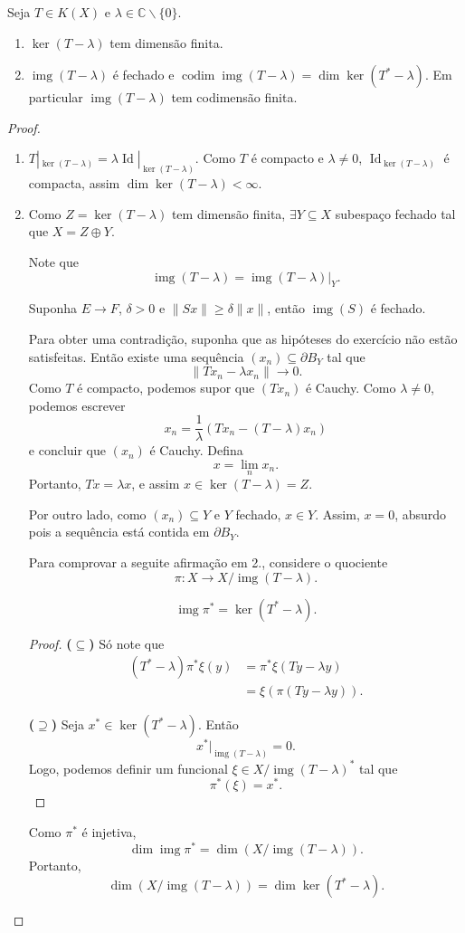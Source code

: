 \documentclass[portuguese]{article}
\theoremstyle{definition}
\newcommand{\C}{\mathbb{C}}
\DeclareMathOperator{\img}{img}
\DeclareMathOperator{\Id}{Id}
\begin{document}
\begin{teo}
	Seja $T\in K(X)$ e $\lambda\in\C\backslash\{0\}$.
	\begin{enumerate}
		\item $\ker(T-\lambda)$ tem dimensão finita.
		\item $\img(T-\lambda)$ é fechado e $\operatorname{codim}\img(T-\lambda)=\dim\ker(T^*-\lambda)$.
		Em particular $\img(T-\lambda)$ tem codimensão finita.
	\end{enumerate}
\end{teo}
\begin{proof}\leavevmode
	\begin{enumerate}
		\item $T|_{\ker(T-\lambda)}=\lambda\Id|_{\ker(T-\lambda)}$. Como $T$ é compacto e $\lambda\neq0$, $\Id_{\ker(T-\lambda)}$ é compacta, assim $\dim\ker(T-\lambda)<\infty$.
		\item Como $Z=\ker(T-\lambda)$ tem dimensão finita, $\exists Y\subseteq X$ subespaço fechado tal que $X=Z\oplus Y$.
		
		Note que
		\[\img(T-\lambda)=\img(T-\lambda)|_Y.\]
		\begin{exer}\label{exer:img-fechada}
			Suponha $E\to F$, $\delta>0$ e $\|Sx\|\geq \delta\|x\|$, então $\img(S)$ é fechado.
		\end{exer}
		Para obter uma contradição, suponha que as hipóteses do exercício não estão satisfeitas. Então existe uma sequência $(x_n)\subseteq\partial B_Y$ tal que
		\[\|Tx_n-\lambda x_n\|\to 0.\]
		Como $T$ é compacto, podemos supor que $(Tx_n)$ é Cauchy. Como $\lambda\neq0$, podemos escrever
		\[x_n=\frac{1}{\lambda}(Tx_n-(T-\lambda)x_n)\]
		e concluir que $(x_n)$ é Cauchy. Defina
		\[x=\lim_nx_n.\]
		Portanto, $Tx=\lambda x$, e assim $x\in \ker(T-\lambda)=Z$.
		
		Por outro lado, como $(x_n)\subseteq Y$ e $Y$ fechado, $x\in Y$. Assim, $x=0$, absurdo pois a sequência está contida em $\partial B_Y$.
		
		Para comprovar a seguite afirmação em 2., considere o quociente
		\[\pi:X\to X/\img(T-\lambda).\]
		\begin{af*}
			\[\img \pi^*=\ker(T^*-\lambda).\]
		\end{af*}
		\begin{proof}\leavevmode
			
			\textbf{($\subseteq$)} Só note que
			\begin{align*}
				(T^*-\lambda)\pi^*\xi(y)&=\pi^*\xi(Ty-\lambda y)\\
				&=\xi (\pi(Ty-\lambda y)).
			\end{align*}
			
			\textbf{($\supseteq$)} Seja $x^*\in\ker(T^*-\lambda)$. Então
			\[x^*|_{\img (T-\lambda)}=0.\]
			Logo, podemos definir um funcional $\xi\in X/\img(T-\lambda)^*$ tal que
			\[\pi^*(\xi)=x^*.\]
		\end{proof}
		Como $\pi^*$ é injetiva,
		\[\dim\img\pi^*=\dim(X/\img(T-\lambda)).\]
		Portanto,
		\[\dim(X/\img(T-\lambda))=\dim\ker(T^*-\lambda).\]
	\end{enumerate}
\end{proof}
\end{document}
